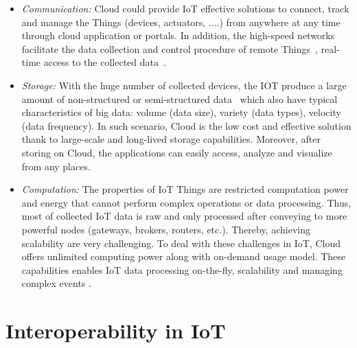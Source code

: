 \begin{itemize}

    \item \textit{Communication: } Cloud could provide IoT effective solutions to connect, track and manage the Things (devices, actuators, ....) from anywhere at any time through cloud application or portals. In addition, the high-speed networks facilitate the data collection and control procedure of remote Things~\cite{fox2012architecture}\cite{suciu2013smart}, real-time access to the collected data~\cite{parwekar2011internet}.
    
    \item \textit{Storage: } With the huge number of collected devices, the IOT produce a large amount of non-structured or semi-structured data~\cite{aguzzi2013definition} which also have typical characteristics of big data: volume (data size),  variety (data types), velocity (data frequency). In such scenario, Cloud is the low cost and effective solution thank to large-scale and long-lived storage capabilities. Moreover, after storing on Cloud, the applications can easily access, analyze and visualize from any places. \\
    
    \item \textit{Computation: } The properties of IoT Things are restricted computation power and energy that cannot perform complex operations or data processing. Thus, most of collected IoT data is raw and only processed after conveying to more powerful nodes (gateways, brokers, routers, etc.). Thereby, achieving scalability are very challenging. To deal with these challenges in IoT, Cloud offers unlimited computing power along with on-demand usage model. These capabilities enables IoT data processing on-the-fly, scalability and managing complex events \cite{dash2010survey}\cite{botta2016integration}.
    
\end{itemize}


\section{Interoperability in IoT }
